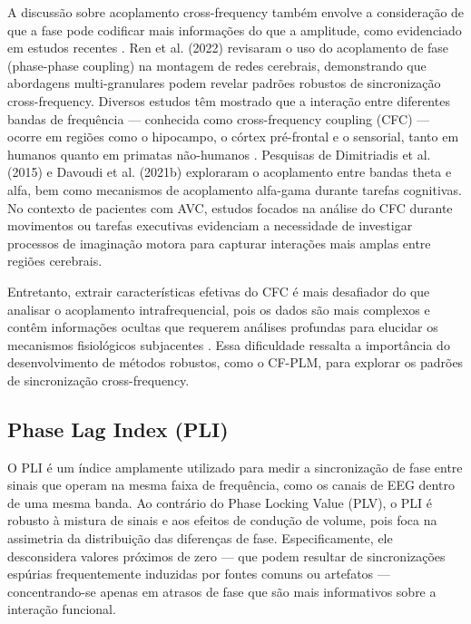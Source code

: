 A discussão sobre acoplamento cross-frequency também envolve a consideração de que a fase pode codificar mais informações do que a amplitude, como evidenciado em estudos recentes \cite{autor2020}. Ren et al. (2022) \cite{ren2022multi} revisaram o uso do acoplamento de fase (phase-phase coupling) na montagem de redes cerebrais, demonstrando que abordagens multi-granulares podem revelar padrões robustos de sincronização cross-frequency. Diversos estudos têm mostrado que a interação entre diferentes bandas de frequência — conhecida como cross-frequency coupling (CFC) — ocorre em regiões como o hipocampo, o córtex pré-frontal e o sensorial, tanto em humanos quanto em primatas não-humanos \cite{mormann2005, canolty2006, jensen2007, khamechian2020}. Pesquisas de Dimitriadis et al. (2015) e Davoudi et al. (2021b) exploraram o acoplamento entre bandas theta e alfa, bem como mecanismos de acoplamento alfa-gama durante tarefas cognitivas. No contexto de pacientes com AVC, estudos focados na análise do CFC durante movimentos ou tarefas executivas evidenciam a necessidade de investigar processos de imaginação motora para capturar interações mais amplas entre regiões cerebrais.

Entretanto, extrair características efetivas do CFC é mais desafiador do que analisar o acoplamento intrafrequencial, pois os dados são mais complexos e contêm informações ocultas que requerem análises profundas para elucidar os mecanismos fisiológicos subjacentes \cite{ren2022multi}. Essa dificuldade ressalta a importância do desenvolvimento de métodos robustos, como o CF-PLM, para explorar os padrões de sincronização cross-frequency.

\subsection{Phase Lag Index (PLI)}

O PLI é um índice amplamente utilizado para medir a sincronização de fase entre sinais que operam na mesma faixa de frequência, como os canais de EEG dentro de uma mesma banda. Ao contrário do Phase Locking Value (PLV), o PLI é robusto à mistura de sinais e aos efeitos de condução de volume, pois foca na assimetria da distribuição das diferenças de fase. Especificamente, ele desconsidera valores próximos de zero — que podem resultar de sincronizações espúrias frequentemente induzidas por fontes comuns ou artefatos — concentrando-se apenas em atrasos de fase que são mais informativos sobre a interação funcional.


